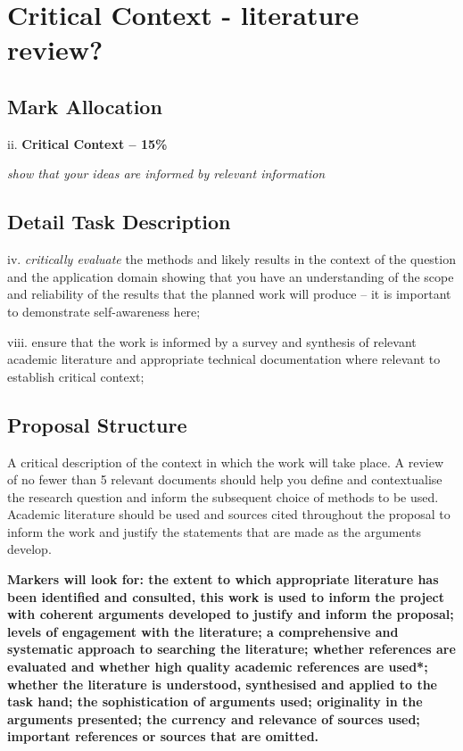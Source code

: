\section{Critical Context - literature review?}

\subsection{Mark Allocation}

ii. \textbf{Critical Context -- 15\%}

\textit{show that your ideas are informed by relevant information}

\subsection{Detail Task Description} 
iv. \textit{critically evaluate} the methods and likely results in the context of the question and the application domain showing that you have an understanding of the scope and reliability of the results that the planned work will produce -- it is important to demonstrate self-awareness here;

viii. ensure that the work is informed by a survey and synthesis of relevant academic literature and appropriate technical documentation where relevant to establish critical context;

\subsection{Proposal Structure}
A critical description of the context in which the work will take place. A review of no fewer than 5 relevant documents should help you define and contextualise the research question and inform the subsequent choice of methods to be used. Academic literature should be used and sources cited throughout the proposal to inform the work and justify the statements that are made as the arguments develop.

\textbf{Markers will look for: the extent to which appropriate literature has been identified and consulted, this work is used to inform the project with coherent arguments developed to justify and inform the proposal; levels of engagement with the literature; a comprehensive and systematic approach to searching the literature; whether references are evaluated and whether high quality academic references are used*; whether the literature is understood, synthesised and applied to the task hand; the sophistication of arguments used; originality in the arguments presented; the currency and relevance of sources used; important references or sources that are omitted.}

